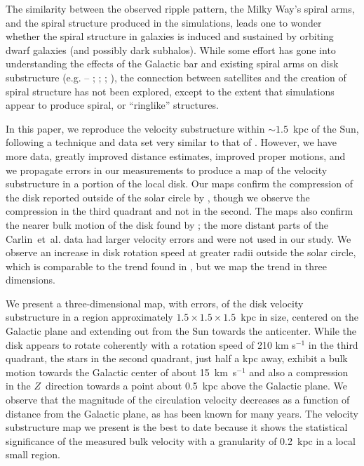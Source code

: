 \documentclass[11pt,preprint]{aastex6}
\begin{document}
The similarity between the observed ripple pattern, the Milky Way's spiral arms, and the spiral structure produced in the simulations, leads one to wonder whether the spiral structure in galaxies is induced and sustained by orbiting dwarf galaxies (and possibly dark subhalos).  While some effort has gone into understanding the effects of the Galactic bar and existing spiral arms on disk substructure (e.g. -- \citealt{Faure2014}; \citealt{Debattista2014}; \citealt{Monari2016}; \citealt{Vera2016}), the connection between satellites and the creation of spiral structure \citep{Newberg2017} has not been explored, except to the extent that simulations appear to produce spiral, or ``ringlike'' structures.

In this paper, we reproduce the velocity substructure within $\sim 1.5$~kpc of the Sun, following a technique and data set very similar to that of \citet{Carlin2013}.  However, we have more data, greatly improved distance estimates, improved proper motions, and we propagate errors in our measurements to produce a map of the velocity substructure in a portion of the local disk.  Our maps confirm the compression of the disk reported outside of the solar circle by \citet{Williams2013}, though we observe the compression in the third quadrant and not in the second.  The maps also confirm the nearer bulk motion of the disk found by \citet{Carlin2013}; the more distant parts of the Carlin~et~al. data had larger velocity errors and were not used in our study.  We observe an increase in disk rotation speed at greater radii outside the solar circle, which is comparable to the trend found in \citet{Lopez2014}, but we map the trend in three dimensions.

We present a three-dimensional map, with errors, of the disk velocity substructure in a region approximately $1.5 \times 1.5 \times 1.5$~kpc in size, centered on the Galactic plane and extending out from the Sun towards the anticenter.  While the disk appears to rotate coherently with a rotation speed of 210 km s$^{-1}$ in the third quadrant, the stars in the second quadrant, just half a kpc away, exhibit a bulk motion towards the Galactic center of about 15~km~s$^{-1}$ and also a compression in the $Z$~direction towards a point about 0.5~kpc above the Galactic plane.  We observe that the magnitude of the circulation velocity decreases as a function of distance from the Galactic plane, as has been known for many years.  The velocity substructure map we present is the best to date because it shows the statistical significance of the measured bulk velocity with a granularity of 0.2~kpc in a local small region.
\end{document}
